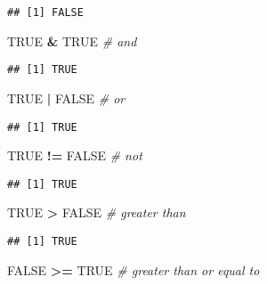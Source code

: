 \documentclass[]{article}
\newenvironment{Shaded}{\begin{snugshade}}{\end{snugshade}}
\newcommand{\StringTok}[1]{\textcolor[rgb]{0.31,0.60,0.02}{#1}}
\newcommand{\CommentTok}[1]{\textcolor[rgb]{0.56,0.35,0.01}{\textit{#1}}}
\newcommand{\OtherTok}[1]{\textcolor[rgb]{0.56,0.35,0.01}{#1}}
\newcommand{\OperatorTok}[1]{\textcolor[rgb]{0.81,0.36,0.00}{\textbf{#1}}}
\begin{document}
\begin{verbatim}
## [1] FALSE
\end{verbatim}

\begin{Shaded}
\begin{Highlighting}[]
\OtherTok{TRUE} \OperatorTok{&}\StringTok{ }\OtherTok{TRUE}   \CommentTok{# and }
\end{Highlighting}
\end{Shaded}

\begin{verbatim}
## [1] TRUE
\end{verbatim}

\begin{Shaded}
\begin{Highlighting}[]
\OtherTok{TRUE} \OperatorTok{|}\StringTok{ }\OtherTok{FALSE}  \CommentTok{# or}
\end{Highlighting}
\end{Shaded}

\begin{verbatim}
## [1] TRUE
\end{verbatim}

\begin{Shaded}
\begin{Highlighting}[]
\OtherTok{TRUE} \OperatorTok{!=}\StringTok{ }\OtherTok{FALSE}  \CommentTok{# not}
\end{Highlighting}
\end{Shaded}

\begin{verbatim}
## [1] TRUE
\end{verbatim}

\begin{Shaded}
\begin{Highlighting}[]
\OtherTok{TRUE} \OperatorTok{>}\StringTok{ }\OtherTok{FALSE} \CommentTok{# greater than}
\end{Highlighting}
\end{Shaded}

\begin{verbatim}
## [1] TRUE
\end{verbatim}

\begin{Shaded}
\begin{Highlighting}[]
\OtherTok{FALSE} \OperatorTok{>=}\StringTok{ }\OtherTok{TRUE} \CommentTok{# greater than or equal to}
\end{Highlighting}
\end{Shaded}
\end{document}
